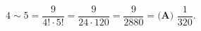 $4\sim5=\dfrac{9}{4!\cdot5!}=\dfrac{9}{24\cdot120}=\dfrac{9}{2880}=\boxed{\textbf{(A) }\dfrac1{320}}$.
